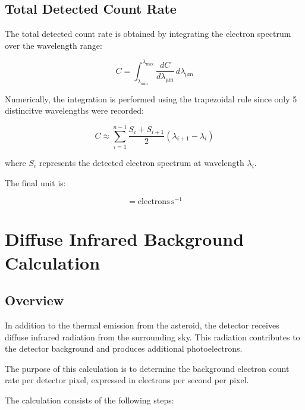 \documentclass{article}
\begin{document}
\subsection{Total Detected Count Rate}

The total detected count rate is obtained by integrating the electron spectrum over the wavelength range:

\begin{equation}
C =
\int_{\lambda_{\min}}^{\lambda_{\max}}
\frac{dC}{d\lambda_{\mathrm{\mu m}}}
\,d\lambda_{\mathrm{\mu m}}
\end{equation}

Numerically, the integration is performed using the trapezoidal rule since only 5 distincitve wavelengths were recorded:

\begin{equation}
C \approx
\sum_{i=1}^{n-1}
\frac{
S_i + S_{i+1}
}{2}
(\lambda_{i+1}-\lambda_i)
\end{equation}

where $S_i$ represents the detected electron spectrum at wavelength $\lambda_i$.

The final unit is:

\begin{equation}
[C] =
\mathrm{electrons\,s^{-1}}
\end{equation}

\newpage




\section{Diffuse Infrared Background Calculation}

\subsection{Overview}

In addition to the thermal emission from the asteroid, the detector receives diffuse infrared radiation from the surrounding sky. This radiation contributes to the detector background and produces additional photoelectrons.

The purpose of this calculation is to determine the background electron count rate per detector pixel, expressed in electrons per second per pixel.

The calculation consists of the following steps:
\end{document}
